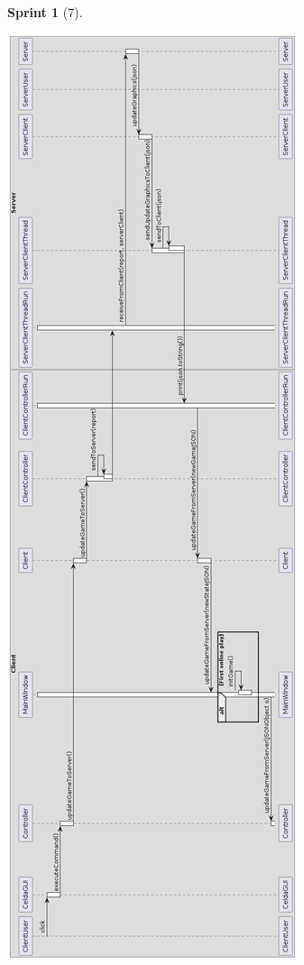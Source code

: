 \documentclass[12pt,a4paper,openright]{book}
\theoremstyle{break}
\newtheorem*{sprint}{Sprint}
\begin{document}
\begin{sprint}[7]
\begin{center}
\includegraphics[scale=0.4]{juegoTipicoUmlSprint7.png}
\end{center}

\end{sprint}
\end{document}
